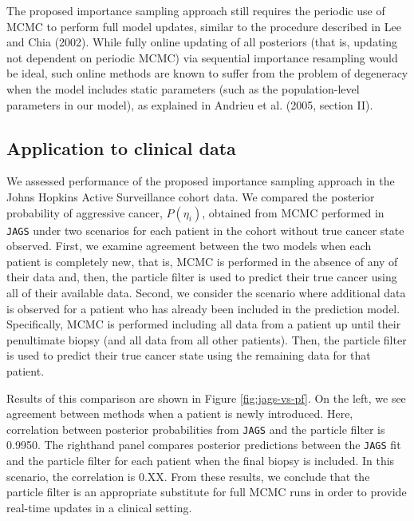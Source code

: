 \documentclass[12pt, letterpaper]{article}
\begin{document}
The proposed importance sampling approach still requires the periodic use of MCMC to perform full model updates, similar to the procedure described in Lee and Chia (2002)\nocite{Lee2002}. While fully online updating of all posteriors (that is, updating not dependent on periodic MCMC) via sequential importance resampling would be ideal, such online methods are known to suffer from the problem of degeneracy when the model includes static parameters (such as the population-level parameters in our model), as explained in Andrieu et al. (2005, section II)\nocite{Andrieu2005}.


\subsection{Application to clinical data}
We assessed performance of the proposed importance sampling approach in the Johns Hopkins Active Surveillance cohort data. We compared the posterior probability of aggressive cancer, $P(\eta_i)$, obtained from MCMC performed in \texttt{JAGS} under two scenarios for each patient in the cohort without true cancer state observed. First, we examine agreement between the two models when each patient is completely new, that is, MCMC is performed in the absence of any of their data and, then, the particle filter is used to predict their true cancer using all of their available data. Second, we consider the scenario where additional data is observed for a patient who has already been included in the prediction model. Specifically, MCMC is performed including all data from a patient up until their penultimate biopsy (and all data from all other patients). Then, the particle filter is used to predict their true cancer state using the remaining data for that patient. 

Results of this comparison are shown in Figure \ref{fig:jags-vs-pf}. On the left, we see agreement between methods when a patient is newly introduced. Here, correlation between posterior probabilities from \texttt{JAGS} and the particle filter is 0.9950. The righthand panel compares posterior predictions between the \texttt{JAGS} fit and the particle filter for each patient when the final biopsy is included. In this scenario, the correlation is 0.XX. From these results, we conclude that the particle filter is an appropriate substitute for full MCMC runs in order to provide real-time updates in a clinical setting. 
\end{document}
